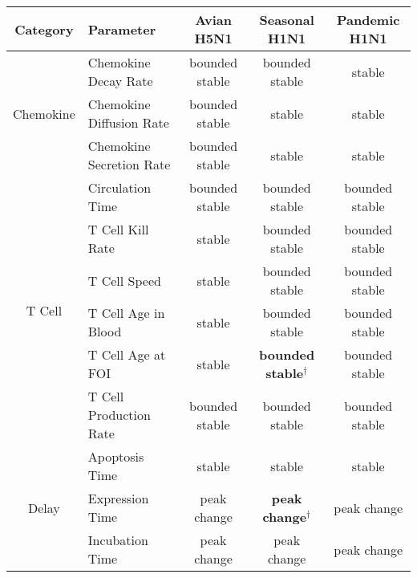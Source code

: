 \documentclass[10pt]{article}
\newenvironment{response}{\fontfamily{cms}\selectfont\small}{\par}
\begin{document}
\begin{itemize}
\begin{response}

\begin{displayquote}

\setcounter{table}{2}
\begin{table}[!ht]
\begin{center}
\begin{tabular}{| c | l | c c c |}
  \hline                        
  Category & Parameter & Avian H5N1 & Seasonal H1N1 & Pandemic H1N1 \\
  \hline
  \multirow{3}{*}{Chemokine} & Chemokine Decay Rate & \cellcolor{blue!30}bounded stable & \cellcolor{blue!30}bounded stable & \cellcolor{green!50}stable \\
  & Chemokine Diffusion Rate & \cellcolor{blue!30}bounded stable & \cellcolor{green!50}stable& \cellcolor{green!50}stable \\
  & Chemokine Secretion Rate & \cellcolor{blue!30}bounded stable & \cellcolor{green!50}stable & \cellcolor{green!50}stable \\
  \hline
  \multirow{6}{*}{T Cell} & Circulation Time & \cellcolor{blue!30}bounded stable & \cellcolor{blue!30}bounded stable & \cellcolor{blue!30}bounded stable \\
  & T Cell Kill Rate & \cellcolor{green!50}stable & \cellcolor{blue!30}bounded stable & \cellcolor{blue!30}bounded stable \\
  & T Cell Speed & \cellcolor{green!50}stable & \cellcolor{blue!30}bounded stable & \cellcolor{blue!30}bounded stable \\
  & T Cell Age in Blood& \cellcolor{green!50}stable & \cellcolor{blue!30}bounded stable& \cellcolor{blue!30}bounded stable \\
  & T Cell Age at FOI& \cellcolor{green!50}stable & \cellcolor{blue!30}\textbf{bounded stable$^\dagger$} & \cellcolor{blue!30}bounded stable \\
  & T Cell Production Rate & \cellcolor{blue!30}bounded stable & \cellcolor{blue!30}bounded stable & \cellcolor{blue!30}bounded stable \\
  \hline
  \multirow{3}{*}{Delay} & Apoptosis Time & \cellcolor{green!50}stable & \cellcolor{green!50}stable & \cellcolor{green!50}stable \\
  & Expression Time & \cellcolor{yellow!50}peak change & \cellcolor{yellow!50}\textbf{peak change$^\dagger$} & \cellcolor{yellow!50}peak change \\
  & Incubation Time &  \cellcolor{yellow!50}peak change & \cellcolor{yellow!50}peak change & \cellcolor{yellow!50}peak change \\

\end{tabular}
\end{center}
\end{table}
\end{displayquote}
\end{response}
\end{itemize}
\end{document}
